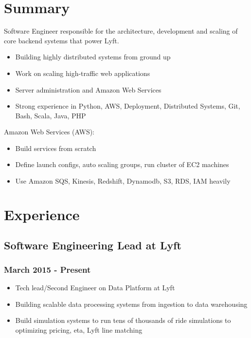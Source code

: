 \documentclass[letterpaper]{article}
\date{\today}
\title{}
\begin{document}

\section{Summary}
\label{sec:Summary}

Software Engineer responsible for the architecture, development and scaling of core backend systems that power Lyft.
\begin{itemize}
\item Building highly distributed systems from ground up
\item Work on scaling high-traffic web applications
\item Server administration and Amazon Web Services
\item Strong experience in Python, AWS, Deployment, Distributed Systems, Git, Bash, Scala, Java, PHP
\end{itemize}

Amazon Web Services (AWS):
\begin{itemize}
\item Build services from scratch
\item Define launch configs, auto scaling groups, run cluster of EC2 machines
\item Use Amazon SQS, Kinesis, Redshift, Dynamodb, S3, RDS, IAM heavily
\end{itemize}

\section{Experience}
\label{sec:Experience}
\subsection{Software Engineering Lead at Lyft}
\label{sec:Software-Engineering-Lead-at-Lyft}
\subsubsection{March 2015 - Present}
\label{sec:March-2015-Present}
\begin{itemize}
\item Tech lead/Second Engineer on Data Platform at Lyft
\item Building scalable data processing systems from ingestion to data warehousing
\item Build simulation systems to run tens of thousands of ride simulations to optimizing pricing, eta, Lyft line matching
\end{itemize}
\end{document}

